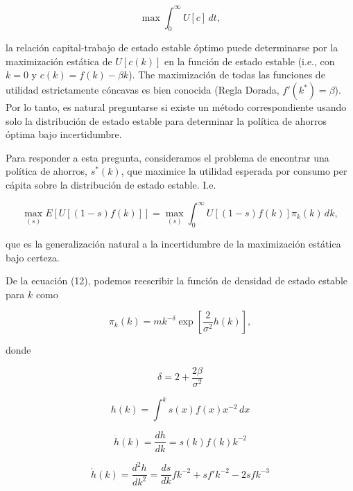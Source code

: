 \documentclass[a4paper,12pt]{article}
\begin{document}
		\begin{equation}
\max \int_0^\infty U[c] \, dt,
		\end{equation}

la relación capital-trabajo de estado estable óptimo puede determinarse por la maximización estática de \( U[c(k)] \) en la función de estado estable (i.e., con \( k = 0 \) y \( c(k) = f(k) - \beta k \)). The maximización de todas las funciones de utilidad estrictamente cóncavas es bien conocida (Regla Dorada, \( f'(k^*) = \beta \)). Por lo tanto, es natural preguntarse si existe un método correspondiente usando solo la distribución de estado estable para determinar la política de ahorros óptima bajo incertidumbre.

Para responder a esta pregunta, consideramos el problema de encontrar una política de ahorros, \( s^*(k) \), que maximice la utilidad esperada por consumo per cápita sobre la distribución de estado estable. I.e.

		\begin{equation}
\max_{(s)} E \left[ U[(1 - s)f(k)] \right] = \max_{(s)} \int_0^\infty U[(1 - s)f(k)] \pi_k(k) \, dk,
		\end{equation}

que es la generalización natural a la incertidumbre de la maximización estática bajo certeza.

De la ecuación (12), podemos reescribir la función de densidad de estado estable para \( k \) como

		\begin{equation}
\pi_k(k) = m k^{-\delta} \exp \left[ \frac{2}{\sigma^2} h(k) \right],
		\end{equation}

donde

		\begin{equation}
\delta = 2 + \frac{2\beta}{\sigma^2}
		\end{equation}

		\begin{equation}
h(k) = \int^k s(x) f(x) x^{-2} \, dx
		\end{equation}

		\begin{equation}
\dot{h}(k) = \frac{dh}{dk} = s(k) f(k) k^{-2}
		\end{equation}

		\begin{equation}
\dot{h}(k) = \frac{d^2 h}{dk^2} = \frac{d s}{dk} f k^{-2} + s f' k^{-2} - 2 s f k^{-3}
		\end{equation}
\end{document}
